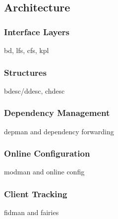 \subsection{Architecture}
\label{subsec:arch}

\subsubsection{Interface Layers}
bd, lfs, cfs, kpl

\subsubsection{Structures}
bdesc/ddesc, chdesc

\subsubsection{Dependency Management}
depman and dependency forwarding

\subsubsection{Online Configuration}
modman and online config

\subsubsection{Client Tracking}
fidman and fairies

